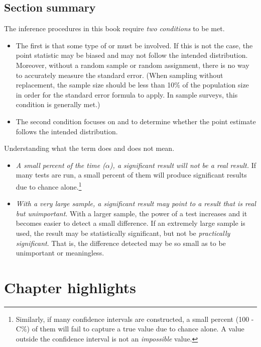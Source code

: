 \textA{\newpage}
\subsection*{Section summary}
\noindent The inference procedures in this book require \emph{two conditions} to be met.
\begin{itemize}
\item The first is that some type of  or  must be involved.  If this is not the case, the point statistic may be biased and may not follow the intended distribution.  Moreover, without a random sample or random assignment, there is no way to accurately measure the standard error.  (When sampling without replacement, the sample size should be less than 10\% of the population size in order for the standard error formula to apply.  In sample surveys, this condition is generally met.)
\item The second condition focuses on  and  to determine whether the point estimate follows the intended distribution.  
\end{itemize}
Understanding what the term  does and does not mean.
\begin{itemize}
\item \emph{A small percent of the time ($\alpha$), a significant result will not be a real result.} If many tests are run, a small percent of them will produce significant results due to chance alone.\footnote{Similarly, if many confidence intervals are constructed, a small percent (100 - C\%) of them will fail to capture a true value due to chance alone.  A value outside the confidence interval is not an \emph{impossible} value.}

\item \emph{With a very large sample, a significant result may point to a result that is real but unimportant}. With a larger sample, the power of a test increases and it becomes easier to detect a small difference.  If an extremely large sample is used, the result may be statistically significant, but not be \emph{practically significant}.  That is, the difference detected may be so small as to be unimportant or meaningless.  
\end{itemize}


\newpage
\section{Chapter highlights}

